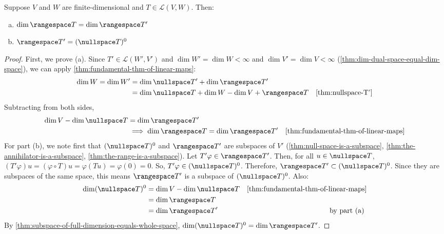 \documentclass{article}
\begin{document}
\begin{theorem}
  \label{thm:range-of-T'}
  Suppose $V$ and $W$ are finite-dimensional and $T \in \mathcal{L}(V,
  W)$. Then:
  \begin{enumerate}[(a)]
  \item $\dim \rangespace T = \dim \rangespace T'$
  \item $\rangespace T' = (\nullspace T)^0$
  \end{enumerate}
\end{theorem}
\begin{proof}
  First, we prove (a). Since $T' \in \mathcal{L}(W', V')$ and $\dim W'
  = \dim W < \infty$ and $\dim V' = \dim V < \infty$
  (\cref{thm:dim-dual-space-equal-dim-space}), we can apply
  \cref{thm:fundamental-thm-of-linear-maps}:
  \begin{align*}
    \dim W = \dim W' &= \dim \nullspace T' + \dim \rangespace T' \\
                     &= \dim \nullspace T + \dim W - \dim V +
                       \rangespace T & \text{\cref{thm:nullspace-T'}} \\
  \end{align*}
  Subtracting from both sides,
  \begin{align*}
    \dim V - \dim \nullspace T &= \dim \rangespace T' \\
    &\implies \dim \rangespace T = \dim \rangespace T' &
                                                  \text{\cref{thm:fundamental-thm-of-linear-maps}}
    \\
  \end{align*}
  For part (b), we note first that $(\nullspace T)^0$ and $\rangespace
  T'$ are subspaces of $V'$ (\cref{thm:null-space-is-a-subspace}, \cref{thm:the-annihilator-is-a-subspace},
  \cref{thm:the-range-is-a-subspace}). Let $T'\varphi \in \rangespace
  T'$. Then, for all $u \in \nullspace T$, $(T' \varphi)u = (\varphi
  \circ T)u = \varphi(Tu) = \varphi(0) = 0$. So, $T'\varphi \in
  (\nullspace T)^0$. Therefore, $\rangespace T' \subset (\nullspace
  T)^0$. Since they are subspaces of the same space, this means
  $\rangespace T'$ is a subspace of $(\nullspace T)^0$. Also:
  \begin{align*}
    \dim (\nullspace T)^0 &= \dim V - \dim \nullspace T & \text{\cref{thm:fundamental-thm-of-linear-maps}}\\
                          &= \dim \rangespace T \\
                          &= \dim \rangespace T' & \text{ by part (a) } \\
  \end{align*}
  By \cref{thm:subspace-of-full-dimension-equals-whole-space}, $\dim
  (\nullspace T)^0 = \dim \rangespace T'$.
\end{proof}
\end{document}

